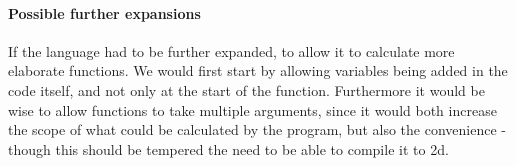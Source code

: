 \paragraph{Possible further expansions}
If the language had to be further expanded, to allow it to calculate
more elaborate functions. We would first start by allowing variables
being added in the code itself, and not only at the start of the
function. 
Furthermore it would be wise to allow functions to take
multiple arguments, since it would both increase the scope of what
could be calculated by the program, but also the convenience - though
this should be tempered the need to be able to compile it to 2d.\\\\

